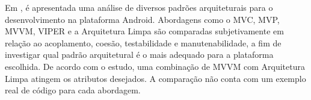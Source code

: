 Em , é apresentada uma análise de diversos padrões arquiteturais para o desenvolvimento na plataforma Android.
Abordagens como o MVC, MVP, MVVM, VIPER e a Arquitetura Limpa são comparadas subjetivamente em relação ao acoplamento, coesão, testabilidade e manutenabilidade, a fim de investigar qual padrão arquitetural é o mais adequado para a plataforma escolhida.
De acordo com o estudo, uma combinação de MVVM com Arquitetura Limpa atingem os atributos desejados.
A comparação não conta com um exemplo real de código para cada abordagem.